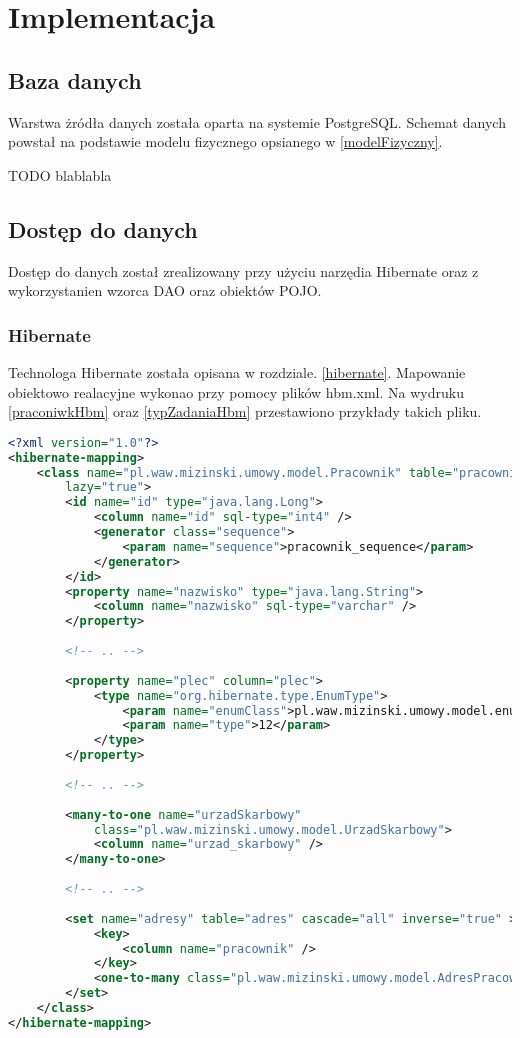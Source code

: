 \chapter{Implementacja}

\section{Baza danych}
Warstwa żródła danych została oparta na systemie PostgreSQL. Schemat danych powstał na podstawie modelu fizycznego opsianego w \ref{modelFizyczny}. 

TODO blablabla

\section{Dostęp do danych}
Dostęp do danych został zrealizowany przy użyciu narzędia Hibernate oraz z wykorzystanien wzorca DAO oraz obiektów POJO.

\subsection[Hibernate][Hibernate]{Hibernate} 
Technologa Hibernate została opisana w rozdziale. \ref{hibernate}. Mapowanie obiektowo realacyjne wykonao przy pomocy plików hbm.xml. Na wydruku \ref{praconiwkHbm} oraz \ref{typZadaniaHbm} przestawiono przykłady takich pliku.



\begin{lstlisting}[language=XML,style=outcode,showstringspaces=false,caption=Przykład pliku mapującego Hibernate,label={praconiwkHbm}]
<?xml version="1.0"?>
<hibernate-mapping>
	<class name="pl.waw.mizinski.umowy.model.Pracownik" table="pracownik"
		lazy="true">
		<id name="id" type="java.lang.Long">
			<column name="id" sql-type="int4" />
			<generator class="sequence">
				<param name="sequence">pracownik_sequence</param>
			</generator>
		</id>
		<property name="nazwisko" type="java.lang.String">
			<column name="nazwisko" sql-type="varchar" />
		</property>
		
		<!-- .. -->
		
		<property name="plec" column="plec">
			<type name="org.hibernate.type.EnumType">
				<param name="enumClass">pl.waw.mizinski.umowy.model.enums.Plec</param>
				<param name="type">12</param>
			</type>
		</property>
		
		<!-- .. -->
		
		<many-to-one name="urzadSkarbowy"
			class="pl.waw.mizinski.umowy.model.UrzadSkarbowy">
			<column name="urzad_skarbowy" />
		</many-to-one>
		
		<!-- .. -->
		
		<set name="adresy" table="adres" cascade="all" inverse="true" >
         	<key>
                <column name="pracownik" />
            </key>
            <one-to-many class="pl.waw.mizinski.umowy.model.AdresPracownika" />
        </set>
	</class>
</hibernate-mapping>
\end{lstlisting}

